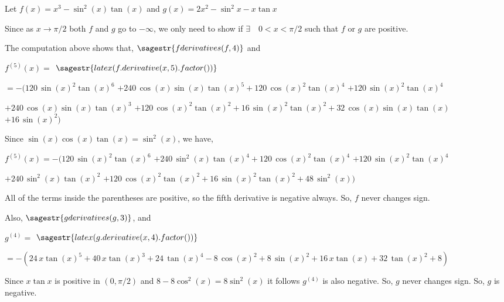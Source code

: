 \documentclass{article}
\begin{document}
Let $f(x) = x^3 - \sin^2(x)\tan(x)$ and $g(x) = 2x^2 - \sin^2 x - x\tan x$

Since as $x\rightarrow \pi/2$ both $f$ and $g$ go to $-\infty$, we
only need to show if $\exists\quad 0<x<\pi/2$ such that $f$ or $g$ are
positive.

The computation above shows that,
$\sagestr{fderivatives(f,4)}$ and

$f^{(5)}(x)=$ $\sagestr{latex(f.derivative(x,5).factor())}$

$= -(120 \, \sin\left(x\right)^{2} \tan\left(x\right)^{6}$
$+ 240 \, \cos\left(x\right) \sin\left(x\right)
\tan\left(x\right)^{5} + 120 \, \cos\left(x\right)^{2}
\tan\left(x\right)^{4}$
$ + 120 \, \sin\left(x\right)^{2} \tan\left(x\right)^{4}$

$ + 240 \, \cos\left(x\right) \sin\left(x\right) \tan\left(x\right)^{3}$
$ + 120 \, \cos\left(x\right)^{2} \tan\left(x\right)^{2} + 16 \,
\sin\left(x\right)^{2} \tan\left(x\right)^{2} + 32 \,
\cos\left(x\right) \sin\left(x\right) \tan\left(x\right) $
$+ 16 \, \sin\left(x\right)^{2} )$

Since $\sin(x)\cos(x)\tan(x) = \sin^2(x)$, we have,


$f^{(5)}(x)$$= -(120 \, \sin\left(x\right)^{2} \tan\left(x\right)^{6}$
$+ 240 \,  \sin^2\left(x\right)
\tan\left(x\right)^{4} + 120 \, \cos\left(x\right)^{2}
\tan\left(x\right)^{4}$
$ + 120 \, \sin\left(x\right)^{2} \tan\left(x\right)^{4}$

$ + 240 \, \sin^2\left(x\right) \tan\left(x\right)^{2}$
$ + 120 \, \cos\left(x\right)^{2} \tan\left(x\right)^{2} + 16 \,
\sin\left(x\right)^{2} \tan\left(x\right)^{2} + 48 \,
\sin^2\left(x\right)) $

All of the terms inside the parentheses are positive, so the fifth
derivative is negative always. So, $f$ never changes sign.


Also, $\sagestr{gderivatives(g, 3)}$, and

$g^{(4)} =$ $\sagestr{latex(g.derivative(x,4).factor())}$

$= -(24 \, x \tan\left(x\right)^{5} + 40 \, x \tan\left(x\right)^{3} + 24 \, \tan\left(x\right)^{4} - 8 \, \cos\left(x\right)^{2} + 8 \, \sin\left(x\right)^{2} + 16 \, x \tan\left(x\right) + 32 \, \tan\left(x\right)^{2} + 8
)$

Since $x\tan x$ is positive in $(0,\pi/2)$ and $8-8\cos^2(x)=
8\sin^2(x)$ it follows $g^{(4)}$ is also negative. So, $g$ never changes
sign. So, $g$ is negative.
\end{document}
